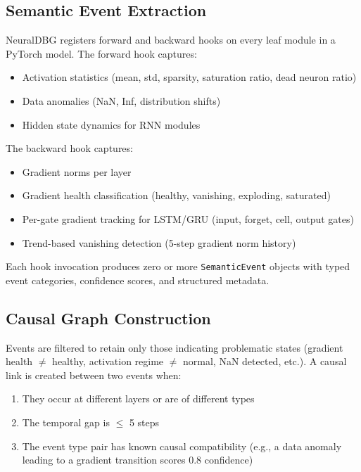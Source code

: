 \documentclass[11pt]{article}
\begin{document}
\subsection{Semantic Event Extraction}

NeuralDBG registers forward and backward hooks on every leaf module in a PyTorch model. The forward hook captures:
\begin{itemize}
    \item Activation statistics (mean, std, sparsity, saturation ratio, dead neuron ratio)
    \item Data anomalies (NaN, Inf, distribution shifts)
    \item Hidden state dynamics for RNN modules
\end{itemize}

The backward hook captures:
\begin{itemize}
    \item Gradient norms per layer
    \item Gradient health classification (healthy, vanishing, exploding, saturated)
    \item Per-gate gradient tracking for LSTM/GRU (input, forget, cell, output gates)
    \item Trend-based vanishing detection (5-step gradient norm history)
\end{itemize}

Each hook invocation produces zero or more \texttt{SemanticEvent} objects with typed event categories, confidence scores, and structured metadata.

\subsection{Causal Graph Construction}

Events are filtered to retain only those indicating problematic states (gradient health $\neq$ healthy, activation regime $\neq$ normal, NaN detected, etc.). A causal link is created between two events when:
\begin{enumerate}
    \item They occur at different layers or are of different types
    \item The temporal gap is $\leq$ 5 steps
    \item The event type pair has known causal compatibility (e.g., a data anomaly leading to a gradient transition scores 0.8 confidence)
\end{enumerate}
\end{document}

